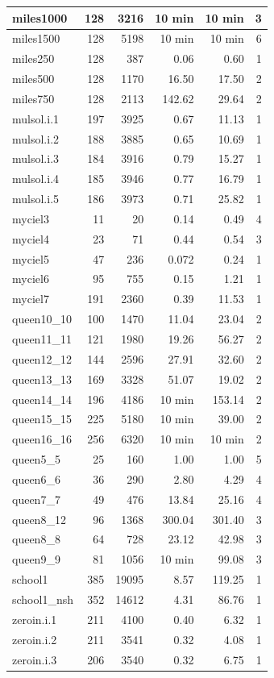 \begin{table}[H]
\begin{tabular}{|l|r|r|r|r|r|}
miles1000 & 128 & 3216 & 10 min & 10 min & 3 \\ \hline
miles1500 & 128 & 5198 & 10 min & 10 min & 6 \\ \hline
miles250 & 128 & 387 & 0.06 & 0.60 & 1 \\ \hline
miles500 & 128 & 1170 & 16.50 & 17.50 & 2 \\ \hline
miles750 & 128 & 2113 & 142.62 & 29.64 & 2 \\ \hline
mulsol.i.1 & 197 & 3925 & 0.67 & 11.13 & 1 \\ \hline
mulsol.i.2 & 188 & 3885 & 0.65 & 10.69 & 1 \\ \hline
mulsol.i.3 & 184 & 3916 & 0.79 & 15.27 & 1 \\ \hline
mulsol.i.4 & 185 & 3946 & 0.77 & 16.79 & 1 \\ \hline
mulsol.i.5 & 186 & 3973 & 0.71 & 25.82 & 1 \\ \hline
myciel3 & 11 & 20 & 0.14 & 0.49 & 4 \\ \hline
myciel4 & 23 & 71 & 0.44 & 0.54 & 3 \\ \hline
myciel5 & 47 & 236 & 0.072 & 0.24 & 1 \\ \hline
myciel6 & 95 & 755 & 0.15 & 1.21 & 1 \\ \hline
myciel7 & 191 & 2360 & 0.39 & 11.53 & 1 \\ \hline
queen10\_10 & 100 & 1470 & 11.04 & 23.04 & 2 \\ \hline
queen11\_11 & 121 & 1980 & 19.26 & 56.27 & 2 \\ \hline
queen12\_12 & 144 & 2596 & 27.91 & 32.60 & 2 \\ \hline
queen13\_13 & 169 & 3328 & 51.07 & 19.02 & 2 \\ \hline
queen14\_14 & 196 & 4186 & 10 min & 153.14 & 2 \\ \hline
queen15\_15 & 225 & 5180 & 10 min & 39.00 & 2 \\ \hline
queen16\_16 & 256 & 6320 & 10 min & 10 min & 2 \\ \hline
queen5\_5 & 25 & 160 & 1.00 & 1.00 & 5 \\ \hline
queen6\_6 & 36 & 290 & 2.80 & 4.29 & 4 \\ \hline
queen7\_7 & 49 & 476 & 13.84 & 25.16 & 4 \\ \hline
queen8\_12 & 96 & 1368 & 300.04 & 301.40 & 3 \\ \hline
queen8\_8 & 64 & 728 & 23.12 & 42.98 & 3 \\ \hline
queen9\_9 & 81 & 1056 & 10 min & 99.08 & 3 \\ \hline
school1 & 385 & 19095 & 8.57 & 119.25 & 1 \\ \hline
school1\_nsh & 352 & 14612 & 4.31 & 86.76  & 1 \\ \hline
zeroin.i.1 & 211 & 4100 & 0.40 & 6.32 & 1 \\ \hline
zeroin.i.2 & 211 & 3541 & 0.32 & 4.08 & 1 \\ \hline
zeroin.i.3 & 206 & 3540 & 0.32 & 6.75 & 1 \\ \hline
\end{tabular}
\end{table}

